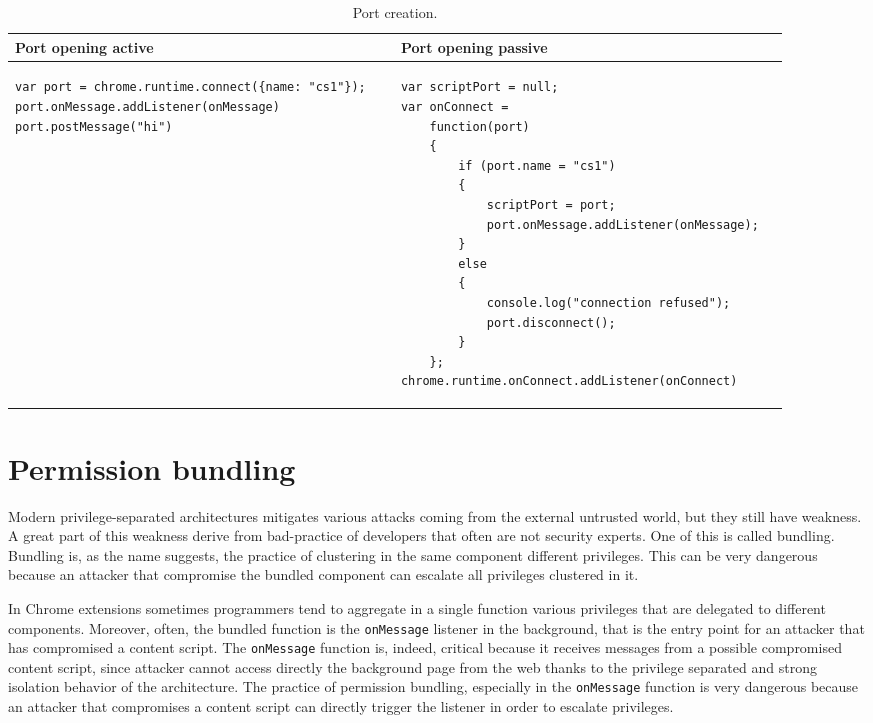 \begin{table}[htb]
\begin{small}
\begin{center}
\begin{tabular}{p{0.45\linewidth} | p{0.45\linewidth}}
Port opening active & Port opening passive\\
\hline
\begin{lstlisting} 
var port = chrome.runtime.connect({name: "cs1"});
port.onMessage.addListener(onMessage)
port.postMessage("hi")
\end{lstlisting}&
\begin{lstlisting} 
var scriptPort = null;
var onConnect = 
	function(port) 
	{ 
		if (port.name = "cs1") 
		{
			scriptPort = port;
			port.onMessage.addListener(onMessage);
		} 
		else 
		{
			console.log("connection refused"); 
			port.disconnect();
		}
	};
chrome.runtime.onConnect.addListener(onConnect)
\end{lstlisting}\\
\end{tabular}
\end{center}
\end{small}
\caption{Port creation.}
\label{tab:MPIPort}
\end{table}

\section{Permission bundling}
\label{sec:BundlingExample}
Modern privilege-separated architectures mitigates various attacks coming from the external untrusted world, but they still have weakness. A great part of this weakness derive from bad-practice of developers that often are not security experts. One of this is called bundling. Bundling is, as the name suggests, the practice of clustering in the same component different privileges. This can be very dangerous because an attacker that compromise the bundled component can escalate all privileges clustered in it. 

In Chrome extensions sometimes programmers tend to aggregate in a single function various privileges that are delegated to different components. Moreover, often, the bundled function is the \texttt{onMessage} listener in the background, that is the entry point for an attacker that has compromised a content script. The \texttt{onMessage} function is, indeed, critical because it receives  messages from a possible compromised content script, since attacker cannot access directly the background page from the web thanks to the privilege separated and strong isolation behavior of the architecture. The practice of permission bundling, especially in the \texttt{onMessage} function is very dangerous because an attacker that compromises a content script can directly trigger the listener in order to escalate privileges. 

